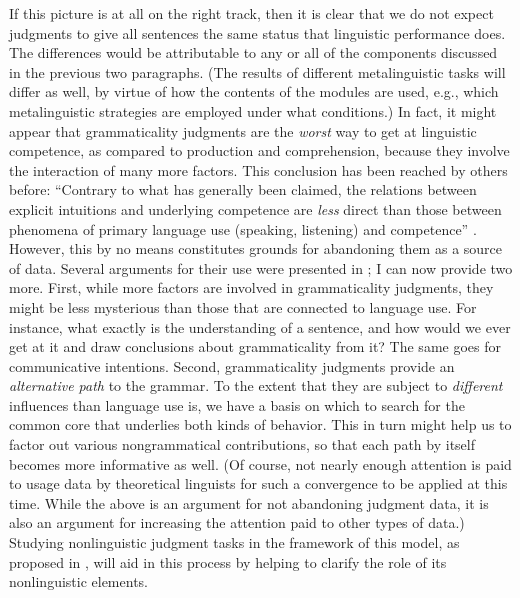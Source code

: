  If this picture is at all on the right track, then it is clear that we do not expect judgments to give all sentences the same status that linguistic performance does. The differences would be attributable to any or all of the components discussed in the previous two paragraphs. (The results of different metalinguistic tasks will differ as well, by virtue of how the contents of the modules are used, e.g., which metalinguistic strategies are employed under what conditions.) In fact, it might appear that grammaticality judgments are the \textit{worst} way to get at linguistic competence, as compared to production and comprehension, because they involve the interaction of many more factors. This conclusion has been reached by others before: ``Contrary to what has generally been claimed, the relations between explicit intuitions and underlying competence are \textit{less} direct than those between phenomena of primary language use (speaking, listening) and competence'' \citep[5\textendash{}6]{LeveltEtAl1978}. However, this by no means constitutes grounds for abandoning them as a source of data. Several arguments for their use were presented in ; I can now provide two more. First, while more factors are involved in grammaticality judgments, they might be less mysterious than those that are connected to language use. For instance, what exactly is the understanding of a sentence, and how would we ever get at it and draw conclusions about grammaticality from it? The same goes for communicative intentions. Second, grammaticality judgments provide an \textit{alternative path} to the grammar. To the extent that they are subject to \textit{different} influences than language use is, we have a basis on which to search for the common core that underlies both kinds of behavior. This in turn might help us to factor out various nongrammatical contributions, so that each path by itself becomes more informative as well. (Of course, not nearly enough attention is paid to usage data by theoretical linguists for such a convergence to be applied at this time. While the above is an argument for not abandoning judgment data, it is also an argument for increasing the attention paid to other types of data.) Studying nonlinguistic judgment tasks in the framework of this model, as proposed in , will aid in this process by helping to clarify the role of its nonlinguistic elements.

